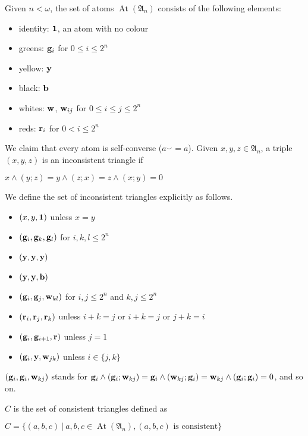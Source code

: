 \documentclass[a4paper]{article}
\theoremstyle{defin}
\theoremstyle{theorem}
\theoremstyle{prop}
\theoremstyle{lemma}
\theoremstyle{ex}
\theoremstyle{col}
\begin{document}
Given $n < \omega$, the set of atoms $\operatorname{At}(\mathfrak{A}_n)$ consists of the following elements:
\begin{itemize}
\item identity: ${\bf 1}$, an atom with no colour
\item greens: ${\bf g}_i$ for $0 \leq i \leq 2^n$
\item yellow: ${\bf y}$
\item black: ${\bf b}$
\item whites: ${\bf w}$, ${\bf w}_{ij}$ for $0 \leq i \leq j \leq 2^n$
\item reds: ${\bf r}_i$ for $0 < i \leq 2^n$
\end{itemize}
We claim that every atom is self-converse ($a^{\smile} = a$). Given $x, y, z \in \mathfrak{A}_n$, a triple $(x,y,z)$ is an  inconsistent triangle if
\begin{center}
$x \land (y ; z) = y \land (z ; x) = z \land (x ; y) = 0$
\end{center}
We define the set of inconsistent triangles explicitly as follows.
\begin{itemize}
  \item $(x, y, {\bf 1})$ unless $x = y$
  \item $({\bf g}_i, {\bf g}_k, {\bf g}_l)$ for $i, k, l \leq 2^n$
  \item $({\bf y}, {\bf y}, {\bf y})$
  \item $({\bf y}, {\bf y}, {\bf b})$
  \item $({\bf g}_i, {\bf g}_j, {\bf w}_{kl})$ for $i, j \leq 2^n$ and $k, j \leq 2^n$
  \item $({\bf r}_i, {\bf r}_j, {\bf r}_k)$ unless $i + k = j$ or $i + k = j$ or $j + k = i$
  \item $({\bf g}_i, {\bf g}_{i + 1}, {\bf r})$ unless $j = 1$
  \item $({\bf g}_i, {\bf y}, {\bf w}_{jk})$ unless $i \in \{ j, k \}$
\end{itemize}
$({\bf g}_i, {\bf g}_i, {\bf w}_{kj})$ stands for ${\bf g}_i \land ({\bf g}_i ; {\bf w}_{kj}) = {\bf g}_i \land ({\bf w}_{kj} ; {\bf g}_i) = {\bf w}_{kj} \land ({\bf g}_i ; {\bf g}_i) = 0$, and so on.

$C$ is the set of consistent triangles defined as

\begin{center}
  $C = \{ (a, b, c ) \: | \: a,b,c \in \operatorname{At}(\mathfrak{A}_n), (a,b,c) \text{ is consistent}\}$
\end{center}
\end{document}

